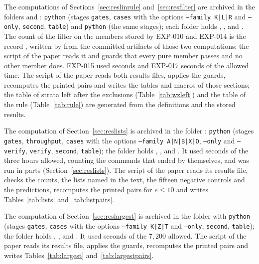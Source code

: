 \documentclass[11pt]{article}
\theoremstyle{definition}
\theoremstyle{remark}
\newcommand{\EXP}[1]{\mbox{EXP-#1}}
\begin{document}
The computations of Sections~\ref{sec:reslinrule} and~\ref{sec:resfilter} are archived in the folders  and : \texttt{python}  (stages \texttt{gates}, \texttt{cases} with the options \texttt{--family K|L|R} and \texttt{--only}, \texttt{second}, \texttt{table}) and \texttt{python}  (the same stages); each folder holds , ,  and . The count of the filter on the members stored by \EXP{010} and \EXP{014} is the record , written by  from the committed artifacts of those two computations; the script of the paper reads it and guards that every pure member passes and no other member does. \EXP{015} used \nlinrSeconds{} seconds and \EXP{017} \nfltSeconds{} seconds of the allowed time. The script of the paper reads both results files, applies the guards, recomputes the printed pairs and writes the tables and macros of those sections; the table of strata left after the exclusions (Table~\ref{tab:wzleft}) and the table of the rule (Table~\ref{tab:rule}) are generated from the definitions and the stored results.

The computation of Section~\ref{sec:reslists} is archived in the folder : \texttt{python}  (stages \texttt{gates}, \texttt{throughput}, \texttt{cases} with the options \texttt{--family A|N|B|X|O}, \texttt{--only} and \texttt{--verify}, \texttt{verify}, \texttt{second}, \texttt{table}); the folder holds , ,  and . It used \nlstSeconds{} seconds of the three hours allowed, counting the commands that ended by themselves, and was run in parts (Section~\ref{sec:reslists}). The script of the paper reads its results file, checks the counts, the lists named in the text, the fifteen negative controls and the predictions, recomputes the printed pairs for $e\le10$ and writes Tables~\ref{tab:lists} and~\ref{tab:listpairs}.

The computation of Section~\ref{sec:reslargest} is archived in the folder  with \texttt{python}  (stages \texttt{gates}, \texttt{cases} with the options \texttt{--family K|Z|T} and \texttt{--only}, \texttt{second}, \texttt{table}); the folder holds , ,  and . It used \nlgsSeconds{} seconds of the $7{,}200$ allowed. The script of the paper reads its results file, applies the guards, recomputes the printed pairs and writes Tables~\ref{tab:largest} and~\ref{tab:largestpairs}.
\end{document}
